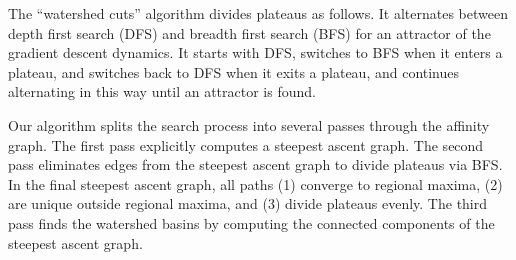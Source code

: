 \documentclass{article}
\begin{document}
The ``watershed cuts'' algorithm \cite{Cousty2009,Cousty2010} divides
plateaus as follows. It alternates between depth first search (DFS)
and breadth first search (BFS) for an attractor of the gradient
descent dynamics.  It starts with DFS, switches to BFS when it enters
a plateau, and switches back to DFS when it exits a plateau, and
continues alternating in this way until an attractor is found.

Our algorithm splits the search process into several passes through
the affinity graph.  The first pass explicitly computes a steepest
ascent graph. The second pass eliminates edges from the steepest
ascent graph to divide plateaus via BFS.  In the final steepest
ascent graph, all paths (1) converge to regional maxima, (2) are
unique outside regional maxima, and (3) divide plateaus evenly.  The
third pass finds the watershed basins by computing the connected
components of the steepest ascent graph.
\end{document}
